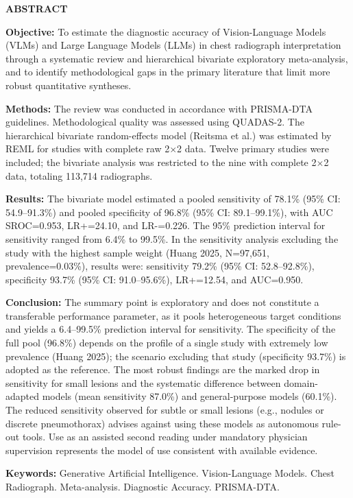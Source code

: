 \documentclass[12pt,a4paper]{article}
\begin{document}
\newpage
\begin{center}
    {\large \textbf{ABSTRACT}}
\end{center}
\vspace{0.5cm}
\begin{singlespace}
\noindent \textbf{Objective:} To estimate the diagnostic accuracy of Vision-Language Models (VLMs) and Large Language Models (LLMs) in chest radiograph interpretation through a systematic review and hierarchical bivariate exploratory meta-analysis, and to identify methodological gaps in the primary literature that limit more robust quantitative syntheses.

\noindent \textbf{Methods:} The review was conducted in accordance with PRISMA-DTA guidelines. Methodological quality was assessed using QUADAS-2. The hierarchical bivariate random-effects model (Reitsma et al.) was estimated by REML for studies with complete raw 2$\times$2 data. Twelve primary studies were included; the bivariate analysis was restricted to the nine with complete 2$\times$2 data, totaling 113,714 radiographs.

\noindent \textbf{Results:} The bivariate model estimated a pooled sensitivity of 78.1\% (95\% CI: 54.9--91.3\%) and pooled specificity of 96.8\% (95\% CI: 89.1--99.1\%), with AUC SROC=0.953, LR+=24.10, and LR-=0.226. The 95\% prediction interval for sensitivity ranged from 6.4\% to 99.5\%. In the sensitivity analysis excluding the study with the highest sample weight (Huang 2025, N=97,651, prevalence=0.03\%), results were: sensitivity 79.2\% (95\% CI: 52.8--92.8\%), specificity 93.7\% (95\% CI: 91.0--95.6\%), LR+=12.54, and AUC=0.950.

\noindent \textbf{Conclusion:} The summary point is exploratory and does not constitute a transferable performance parameter, as it pools heterogeneous target conditions and yields a 6.4--99.5\% prediction interval for sensitivity. The specificity of the full pool (96.8\%) depends on the profile of a single study with extremely low prevalence (Huang 2025); the scenario excluding that study (specificity 93.7\%) is adopted as the reference. The most robust findings are the marked drop in sensitivity for small lesions and the systematic difference between domain-adapted models (mean sensitivity 87.0\%) and general-purpose models (60.1\%). The reduced sensitivity observed for subtle or small lesions (e.g., nodules or discrete pneumothorax) advises against using these models as autonomous rule-out tools. Use as an assisted second reading under mandatory physician supervision represents the model of use consistent with available evidence.

\vspace{0.8cm}
\noindent \textbf{Keywords:} Generative Artificial Intelligence. Vision-Language Models. Chest Radiograph. Meta-analysis. Diagnostic Accuracy. PRISMA-DTA.
\end{singlespace}
\end{document}
